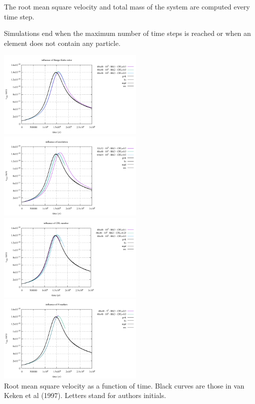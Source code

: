 The root mean square velocity and total mass of the system are computed every time step.

Simulations end when the maximum number of time steps is reached or when 
an element does not contain any particle.
\begin{center}
\includegraphics[width=7cm]{python_codes/fieldstone_41/results/vrms_RK.pdf}
\includegraphics[width=7cm]{python_codes/fieldstone_41/results/vrms_RES.pdf}\\
\includegraphics[width=7cm]{python_codes/fieldstone_41/results/vrms_CFL.pdf}
\includegraphics[width=7cm]{python_codes/fieldstone_41/results/vrms_nmarker.pdf}\\
{\captionfont Root mean square velocity as a function of time. Black curves are those in van Keken
et al (1997). Letters stand for authors initials.}
\end{center}



